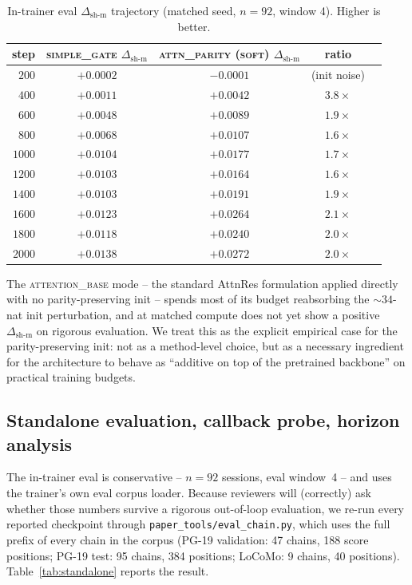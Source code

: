 \documentclass{article}
\newcommand{\dsh}{\Delta_{\text{sh-m}}}
\begin{document}
\begin{table}[t]
\centering
\caption{In-trainer eval $\dsh$ trajectory (matched seed, $n=92$,
window 4). Higher is better.}
\label{tab:headtohead_traj}
\begin{tabular}{rcccc}
\toprule
step & \textsc{simple\_gate} $\dsh$ & \textsc{attn\_parity (soft)} $\dsh$ & ratio \\
\midrule
$200$  & $+0.0002$ & $-0.0001$ & (init noise) \\
$400$  & $+0.0011$ & $+0.0042$ & $3.8\times$ \\
$600$  & $+0.0048$ & $+0.0089$ & $1.9\times$ \\
$800$  & $+0.0068$ & $+0.0107$ & $1.6\times$ \\
$1000$ & $+0.0104$ & $+0.0177$ & $1.7\times$ \\
$1200$ & $+0.0103$ & $+0.0164$ & $1.6\times$ \\
$1400$ & $+0.0103$ & $+0.0191$ & $1.9\times$ \\
$1600$ & $+0.0123$ & $+0.0264$ & $2.1\times$ \\
$1800$ & $+0.0118$ & $+0.0240$ & $2.0\times$ \\
$2000$ & $+0.0138$ & $\mathbf{+0.0272}$ & $2.0\times$ \\
\bottomrule
\end{tabular}
\end{table}

The \textsc{attention\_base} mode -- the standard AttnRes formulation
applied directly with no parity-preserving init -- spends most of its
budget reabsorbing the $\sim 34$-nat init perturbation, and at
matched compute does not yet show a positive $\dsh$ on rigorous
evaluation. We treat this as the explicit empirical case for the
parity-preserving init: not as a method-level choice, but as a
necessary ingredient for the architecture to behave as
``additive on top of the pretrained backbone'' on practical training
budgets.

\subsection{Standalone evaluation, callback probe, horizon analysis}
\label{sec:diagnostics}

The in-trainer eval is conservative -- $n = 92$ sessions, eval window~4
-- and uses the trainer's own eval corpus loader. Because reviewers
will (correctly) ask whether those numbers survive a rigorous
out-of-loop evaluation, we re-run every reported checkpoint through
\texttt{paper\_tools/eval\_chain.py}, which uses the full
prefix of every chain in the corpus (PG-19 validation: 47 chains,
188 score positions; PG-19 test: 95 chains, 384 positions; LoCoMo:
9 chains, 40 positions). Table~\ref{tab:standalone} reports the
result.
\end{document}
